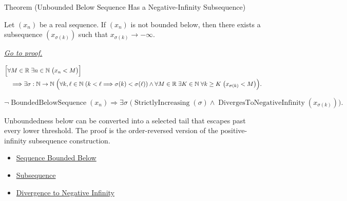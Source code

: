 
\begin{theorembox}{Theorem (Unbounded Below Sequence Has a Negative-Infinity Subsequence)}
\begin{theorem}
\label{thm:unbounded-below-has-negative-infinity-subsequence}
Let $(x_n)$ be a real sequence. If $(x_n)$ is not bounded below, then
there exists a subsequence $(x_{\sigma(k)})$ such that
$x_{\sigma(k)}\to-\infty$.

\smallskip
\noindent
\hyperref[prf:unbounded-below-has-negative-infinity-subsequence]{\textit{Go to proof.}}
\end{theorem}
\end{theorembox}

\begin{remark*}
\[
\begin{aligned}
&\Bigl[
  \forall M\in\mathbb{R}\;\exists n\in\mathbb{N}\;\bigl(x_n<M\bigr)
\Bigr]\\
&\quad\Longrightarrow
\exists \sigma:\mathbb{N}\to\mathbb{N}\;
\Bigl(
  \forall k,\ell\in\mathbb{N}\;(k<\ell\Longrightarrow \sigma(k)<\sigma(\ell))
  \land
  \forall M\in\mathbb{R}\;\exists K\in\mathbb{N}\;\forall k\ge K
  \;\bigl(x_{\sigma(k)}<M\bigr)
\Bigr).
\end{aligned}
\]
\end{remark*}

\begin{remark*}
\[
\neg\operatorname{BoundedBelowSequence}(x_n)
\Longrightarrow
\exists \sigma\;
\bigl(
  \operatorname{StrictlyIncreasing}(\sigma)
  \land
  \operatorname{DivergesToNegativeInfinity}(x_{\sigma(k)})
\bigr).
\]
\end{remark*}

\begin{remark*}[Interpretation]
Unboundedness below can be converted into a selected tail that escapes past
every lower threshold. The proof is the order-reversed version of the
positive-infinity subsequence construction.
\end{remark*}

\begin{dependencies}
\begin{itemize}
  \item \hyperref[def:sequence-bounded-below]{Sequence Bounded Below}
  \item \hyperref[def:subsequence]{Subsequence}
  \item \hyperref[def:diverges-to-negative-infinity]{Divergence to Negative Infinity}
\end{itemize}
\end{dependencies}

